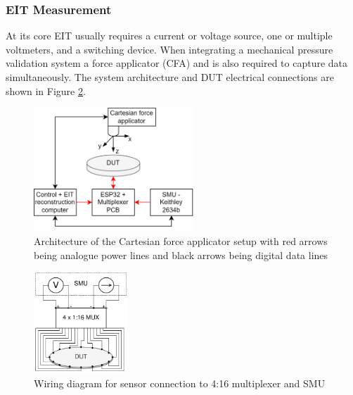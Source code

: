 \subsubsection{EIT Measurement}\label{sec:EIT Measurement}
At its core EIT usually requires a current or voltage source, one or multiple voltmeters, and a switching device. When integrating a mechanical pressure validation system a  force applicator (CFA) and is also required to capture data simultaneously. The system architecture and DUT electrical connections are shown in Figure \ref{fig:wiring_ERT_sensor}. 
\begin{figure}[H]
    \centering
    \includegraphics[width=6cm]{Figures/ERT_MUX_CFA_architecture.jpg}
    \caption{Architecture of the Cartesian force applicator setup with red arrows being analogue power lines and black arrows being digital data lines}
    \label{fig:eit_sensor_architecture}
\end{figure}
\begin{figure}[H]
    \centering
    \includegraphics[width=3.5cm]{Figures/wiring_diagram_ERT_sensor.jpg}
    \caption{Wiring diagram for sensor connection to 4:16 multiplexer and SMU}
    \label{fig:wiring_ERT_sensor}
\end{figure} 

